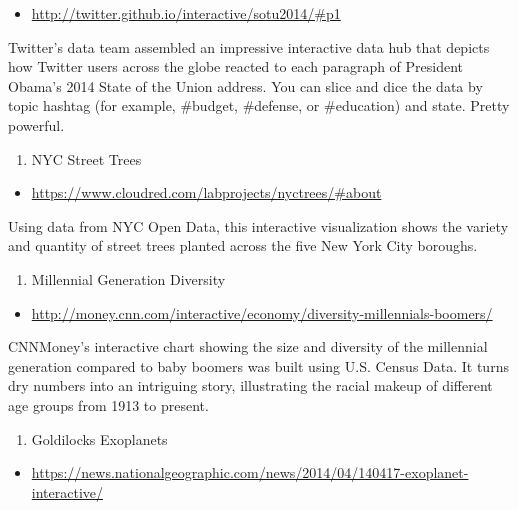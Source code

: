 \documentclass[]{book}
\providecommand{\tightlist}{%
  \setlength{\itemsep}{0pt}\setlength{\parskip}{0pt}}
\theoremstyle{definition}
\theoremstyle{definition}
\theoremstyle{definition}
\theoremstyle{remark}
\begin{document}
\begin{itemize}
\tightlist
\item
  \url{http://twitter.github.io/interactive/sotu2014/\#p1}
\end{itemize}

Twitter's data team assembled an impressive interactive data hub that
depicts how Twitter users across the globe reacted to each paragraph of
President Obama's 2014 State of the Union address. You can slice and
dice the data by topic hashtag (for example, \#budget, \#defense, or
\#education) and state. Pretty powerful.

\begin{enumerate}
\def\labelenumi{\arabic{enumi}.}
\setcounter{enumi}{7}
\tightlist
\item
  NYC Street Trees
\end{enumerate}

\begin{itemize}
\tightlist
\item
  \url{https://www.cloudred.com/labprojects/nyctrees/\#about}
\end{itemize}

Using data from NYC Open Data, this interactive visualization shows the
variety and quantity of street trees planted across the five New York
City boroughs.

\begin{enumerate}
\def\labelenumi{\arabic{enumi}.}
\setcounter{enumi}{8}
\tightlist
\item
  Millennial Generation Diversity
\end{enumerate}

\begin{itemize}
\tightlist
\item
  \url{http://money.cnn.com/interactive/economy/diversity-millennials-boomers/}
\end{itemize}

CNNMoney's interactive chart showing the size and diversity of the
millennial generation compared to baby boomers was built using U.S.
Census Data. It turns dry numbers into an intriguing story, illustrating
the racial makeup of different age groups from 1913 to present.

\begin{enumerate}
\def\labelenumi{\arabic{enumi}.}
\setcounter{enumi}{9}
\tightlist
\item
  Goldilocks Exoplanets
\end{enumerate}

\begin{itemize}
\tightlist
\item
  \url{https://news.nationalgeographic.com/news/2014/04/140417-exoplanet-interactive/}
\end{itemize}
\end{document}

